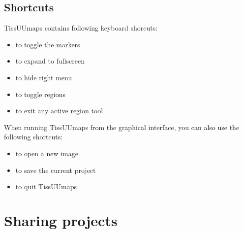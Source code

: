 \documentclass[letterpaper,10pt,english,openany,oneside]{sphinxmanual}
\begin{document}
\section{Shortcuts}
\label{\detokenize{docs/starting/shortcuts:shortcuts}}\label{\detokenize{docs/starting/shortcuts::doc}}
\sphinxAtStartPar
TissUUmaps contains following keyboard shorcuts:
\begin{itemize}
\item {} 
\sphinxAtStartPar
{} \sphinxhyphen{} to toggle the markers

\item {} 
\sphinxAtStartPar
{} \sphinxhyphen{} to expand to fullscreen

\item {} 
\sphinxAtStartPar
{} \sphinxhyphen{} to hide right menu

\item {} 
\sphinxAtStartPar
{} \sphinxhyphen{} to toggle regions

\item {} 
\sphinxAtStartPar
{} \sphinxhyphen{} to exit any active region tool

\end{itemize}

\sphinxAtStartPar
When running TissUUmaps from the graphical interface, you can also use the following shortcuts:
\begin{itemize}
\item {} 
\sphinxAtStartPar
{} \sphinxhyphen{} to open a new image

\item {} 
\sphinxAtStartPar
{} \sphinxhyphen{} to save the current project

\item {} 
\sphinxAtStartPar
{} \sphinxhyphen{} to quit TissUUmaps

\end{itemize}

\sphinxstepscope


\chapter{Sharing projects}
\label{\detokenize{docs/sharing/index:sharing-projects}}\label{\detokenize{docs/sharing/index::doc}}
\sphinxstepscope
\end{document}
